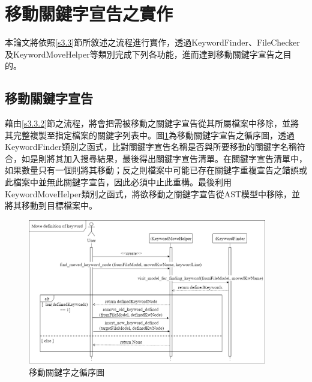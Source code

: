 \section{移動關鍵字宣告之實作}
\indent
本論文將依照\ref{s3.3}節所敘述之流程進行實作，透過KeywordFinder、FileChecker及KeywordMoveHelper等類別完成下列各功能，進而達到移動關鍵字宣告之目的。

\subsection{移動關鍵字宣告}
%
\indent
藉由\ref{s3.3.2}節之流程，將會把需被移動之關鍵字宣告從其所屬檔案中移除，並將其完整複製至指定檔案的關鍵字列表中。圖\ref{f4.7}為移動關鍵字宣告之循序圖，透過KeywordFinder類別之函式，比對關鍵字宣告名稱是否與所要移動的關鍵字名稱符合，如是則將其加入搜尋結果，最後得出關鍵字宣告清單。在關鍵字宣告清單中，如果數量只有一個則將其移動；反之則檔案中可能已存在關鍵字重複宣告之錯誤或此檔案中並無此關鍵字宣告，因此必須中止此重構。最後利用KeywordMoveHelper類別之函式，將欲移動之關鍵字宣告從AST模型中移除，並將其移動到目標檔案中。

\begin{figure}[H]
	\centering
    \includegraphics[width=0.93\textwidth]{picture/ch4/sequenceDiagram/Move_definition_of_keyword_sequence_diagram.png}
    \caption{移動關鍵字之循序圖}
    \label{f4.7}
\end{figure}

